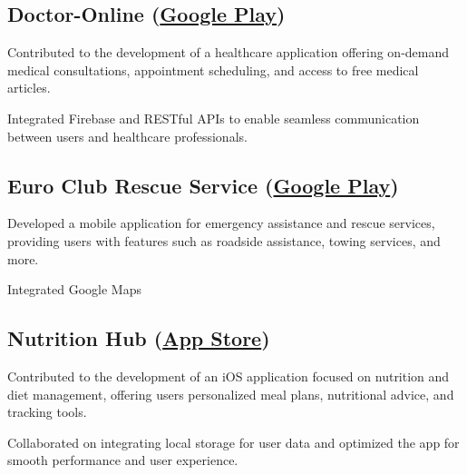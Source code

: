 \subsection{Doctor-Online (\href{https://play.google.com/store/apps/details?id=com.banna.doctoronline}{Google Play})}
\begin{zitemize}
\item Contributed to the development of a healthcare application offering on-demand medical consultations, appointment scheduling, and access to free medical articles.
\item Integrated Firebase and RESTful APIs to enable seamless communication between users and healthcare professionals.

\end{zitemize}


\subsection{Euro Club Rescue Service (\href{https://play.google.com/store/apps/details?id=com.euroclub.rescue}{Google Play})}
\begin{zitemize}
\item Developed a mobile application for emergency assistance and rescue services, providing users with features such as roadside assistance, towing services, and more.
\item Integrated Google Maps

\end{zitemize}

\subsection{Nutrition Hub (\href{https://apps.apple.com/eg/app/\%D9\%85\%D8\%B1\%D9\%83\%D8\%B2-\%D8\%A7\%D9\%84\%D8\%AA\%D8\%BA\%D8\%B0\%D9\%8A\%D8\%A9-nutrition-hub/id6475817915}{App Store})}
\begin{zitemize}
\item Contributed to the development of an iOS application focused on nutrition and diet management, offering users personalized meal plans, nutritional advice, and tracking tools.
\item Collaborated on integrating local storage for user data and optimized the app for smooth performance and user experience.
\end{zitemize}


